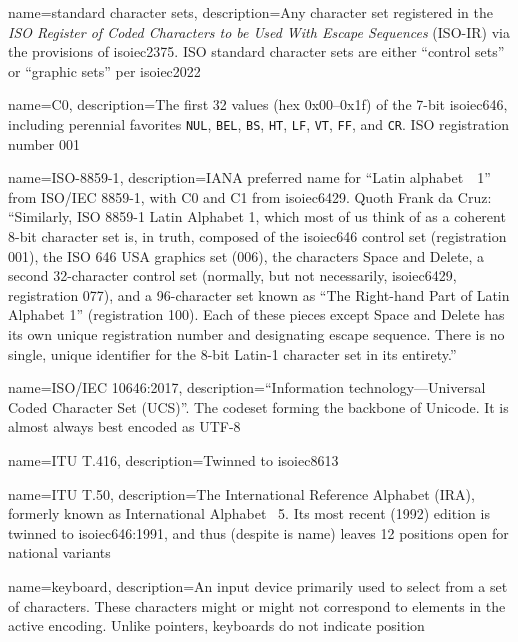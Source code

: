 {
  name={standard character sets},
  description={Any character set registered in the \textit{ISO Register of Coded
               Characters to be Used With Escape Sequences} (ISO-IR) via the
             provisions of \Gls{isoiec2375}. ISO standard character sets are
             either ``control sets'' or ``graphic sets'' per \Gls{isoiec2022}}
}

{
  name={C0},
  description={The first 32 values (hex 0x00--0x1f) of the 7-bit
    \Gls{isoiec646}, including perennial favorites \texttt{NUL}, \texttt{BEL}, \texttt{BS},
    \texttt{HT}, \texttt{LF}, \texttt{VT}, \texttt{FF}, and \texttt{CR}.
    ISO registration number 001}
}

{
  name={ISO-8859-1},
  description={IANA preferred name for ``Latin alphabet~\textnumero\ 1'' from ISO/IEC 8859-1,
    with \Gls{C0} and C1 from \Gls{isoiec6429}. Quoth Frank da Cruz:
    ``Similarly, ISO 8859-1 Latin Alphabet 1, which most of us think of as a
    coherent 8-bit character set is, in truth, composed of the \Gls{isoiec646}
    control set (registration 001), the ISO 646 USA graphics set (006), the
    characters Space and Delete, a second 32-character control set (normally,
    but not necessarily, \Gls{isoiec6429}, registration 077), and a 96-character set
    known as ``The Right-hand Part of Latin Alphabet 1'' (registration 100). Each of
    these pieces except Space and Delete has its own unique registration number
    and designating escape sequence. There is no single, unique identifier for
    the 8-bit Latin-1 character set in its entirety\cite{interchange}.''
  }
}

{
  name={ISO/IEC 10646:2017},
  description={``Information technology---Universal Coded Character Set (UCS)''.
    The \gls{codeset} forming the backbone of Unicode. It is almost
   always best encoded as UTF-8}
}

{
  name={ITU T.416},
  description={Twinned to \Gls{isoiec8613}}
}

{
  name={ITU T.50},
  description={The International Reference Alphabet (IRA), formerly known as
   International Alphabet \textnumero\ 5. Its most recent (1992)
   edition is twinned to \Gls{isoiec646}:1991, and thus (despite is name)
   leaves 12 positions open for national variants}
}

{
  name={keyboard},
  description={An input device primarily used to select from a set of
  characters. These characters might or might not correspond to elements in
  the active encoding. Unlike pointers, keyboards do not indicate position}
}

